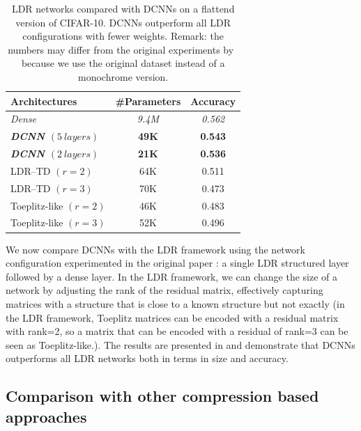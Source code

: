 \begin{table}[htb]
  \centering
  \begin{tabular}{lcc}
    \toprule
    \textbf{Architectures} & \textbf{\#Parameters} & \textbf{Accuracy}  \\
    \midrule
    \textit{Dense} & \textit{9.4M}	 & \textit{0.562} \\
    \textbf{\textit{DCNN $(5\ layers)$}} & \textbf{49K}	& \textbf{0.543} \\
    \textbf{\textit{DCNN $(2\ layers)$}} & \textbf{21K} & \textbf{0.536} \\
    LDR--TD	$(r = 2)$	         & 64K	& 0.511 \\
    LDR--TD	$(r = 3)$	         & 70K	& 0.473 \\
    Toeplitz-like $(r=2)$	         & 46K	& 0.483 \\
    Toeplitz-like $(r =3)$	         & 52K  & 0.496 \\
    \bottomrule
    \end{tabular}
    \caption{LDR networks compared with DCNNs on a flattend version of CIFAR-10. DCNNs outperform all LDR configurations with fewer weights. Remark: the numbers may differ from the original experiments by~\citet{thomas2018learning} because we use the original dataset instead of a monochrome version.}
    \label{table:ch4-xp_ldr}
\end{table}

We now compare DCNNs with the LDR framework using the network configuration experimented in the original paper \cite{thomas2018learning}: a single LDR structured layer followed by a dense layer.
In the LDR framework, we can change the size of a network by adjusting the rank of the residual matrix, effectively capturing matrices with a structure that is close to a known structure but not exactly (in the LDR framework, Toeplitz matrices can be encoded with a residual matrix with rank=2, so a matrix that can be encoded with a residual of rank=3 can be seen as Toeplitz-like.).
The results are presented in  and demonstrate that DCNNs outperforms all LDR networks both in terms in size and accuracy.


\subsection{Comparison with other compression based approaches}
\label{subsection:ch4-comparison_with_other_compression_based_approaches}


